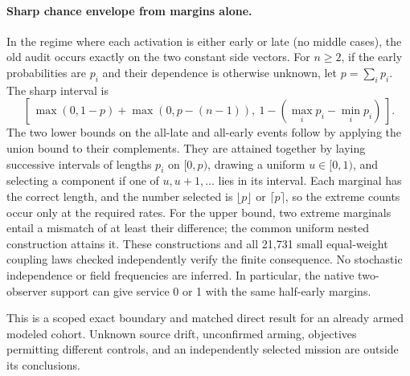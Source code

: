 \documentclass{article}
\begin{document}
\paragraph{Sharp chance envelope from margins alone.}
In the regime where each activation is either early or late
(no middle cases), the old audit occurs exactly on the two
constant side vectors. For \(n\ge2\), if the early probabilities
are \(p_i\) and their dependence is otherwise unknown, let
\(p=\sum_i p_i\). The sharp interval is
\[
 [\,\max(0,1-p)+\max(0,p-(n-1)),\
                  1-(\max_i p_i-\min_i p_i)\,].
\]
The two lower bounds on the all-late and all-early events follow
by applying the union bound to their complements. They are
attained together by laying successive intervals of lengths
\(p_i\) on \([0,p)\), drawing a uniform \(u\in[0,1)\), and
selecting a component if one of \(u,u+1,\ldots\) lies in its
interval. Each marginal has the correct length, and the number
selected is \(\lfloor p\rfloor\) or \(\lceil p\rceil\), so the
extreme counts occur only at the required rates.
For the upper bound, two extreme marginals entail a mismatch
of at least their difference; the common uniform nested
construction attains it. These constructions and all 21,731
small equal-weight coupling laws checked independently verify
the finite consequence. No stochastic independence or
field frequencies are inferred. In particular, the native
two-observer support can give service 0 or 1 with the same
half-early margins.

This is a scoped exact boundary and matched direct result for
an already armed modeled cohort. Unknown source drift, unconfirmed
arming, objectives permitting different controls, and an
independently selected mission are outside its conclusions.
\end{document}
